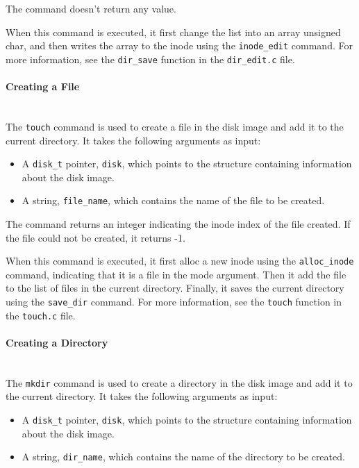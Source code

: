 \documentclass{article}
\begin{document}
The command doesn't return any value.

When this command is executed, it first change the list into an array unsigned char, and then writes the array to the inode using the \texttt{inode\_edit} command. For more information, see the \texttt{dir\_save} function in the \texttt{dir\_edit.c} file.

\paragraph{Creating a File}\mbox{}\\
The \texttt{touch} command is used to create a file in the disk image and add it to the current directory. It takes the following arguments as input:

\begin{itemize}
    \item A \texttt{disk\_t} pointer, \texttt{disk}, which points to the structure containing information about the disk image.
    \item A string, \texttt{file\_name}, which contains the name of the file to be created.
\end{itemize}

The command returns an integer indicating the inode index of the file created. If the file could not be created, it returns -1.

When this command is executed, it first alloc a new inode using the \texttt{alloc\_inode} command, indicating that it is a file in the mode argument. Then it add the file to the list of files in the current directory. Finally, it saves the current directory using the \texttt{save\_dir} command. For more information, see the \texttt{touch} function in the \texttt{touch.c} file.

\paragraph{Creating a Directory}\mbox{}\\
The \texttt{mkdir} command is used to create a directory in the disk image and add it to the current directory. It takes the following arguments as input:

\begin{itemize}
    \item A \texttt{disk\_t} pointer, \texttt{disk}, which points to the structure containing information about the disk image.
    \item A string, \texttt{dir\_name}, which contains the name of the directory to be created.
\end{itemize}
\end{document}
